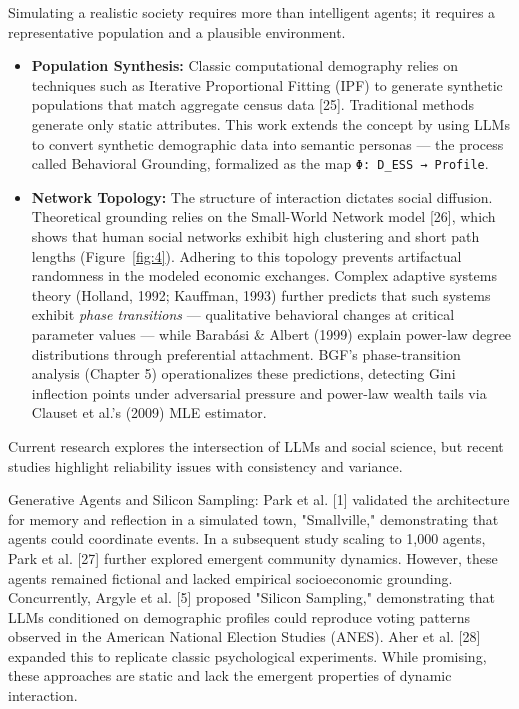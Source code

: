 
Simulating a realistic society requires more than intelligent agents; it requires a representative population and a plausible environment.

\begin{itemize}
\item \textbf{Population Synthesis:} Classic computational demography relies on techniques such as Iterative Proportional Fitting (IPF) to generate synthetic populations that match aggregate census data [25]. Traditional methods generate only static attributes. This work extends the concept by using LLMs to convert synthetic demographic data into semantic personas — the process called Behavioral Grounding, formalized as the map \texttt{Φ: D\_ESS → Profile}.
\item \textbf{Network Topology:} The structure of interaction dictates social diffusion. Theoretical grounding relies on the Small-World Network model [26], which shows that human social networks exhibit high clustering and short path lengths (Figure~\ref{fig:4}). Adhering to this topology prevents artifactual randomness in the modeled economic exchanges. Complex adaptive systems theory (Holland, 1992; Kauffman, 1993) further predicts that such systems exhibit \textit{phase transitions} — qualitative behavioral changes at critical parameter values — while Barabási \& Albert (1999) explain power-law degree distributions through preferential attachment. BGF's phase-transition analysis (Chapter 5) operationalizes these predictions, detecting Gini inflection points under adversarial pressure and power-law wealth tails via Clauset et al.'s (2009) MLE estimator.
\end{itemize}


Current research explores the intersection of LLMs and social science, but recent studies highlight reliability issues with consistency and variance.


Generative Agents and Silicon Sampling: Park et al. [1] validated the architecture for memory and reflection in a simulated town, "Smallville," demonstrating that agents could coordinate events. In a subsequent study scaling to 1,000 agents, Park et al. [27] further explored emergent community dynamics. However, these agents remained fictional and lacked empirical socioeconomic grounding. Concurrently, Argyle et al. [5] proposed "Silicon Sampling," demonstrating that LLMs conditioned on demographic profiles could reproduce voting patterns observed in the American National Election Studies (ANES). Aher et al. [28] expanded this to replicate classic psychological experiments. While promising, these approaches are static and lack the emergent properties of dynamic interaction.

